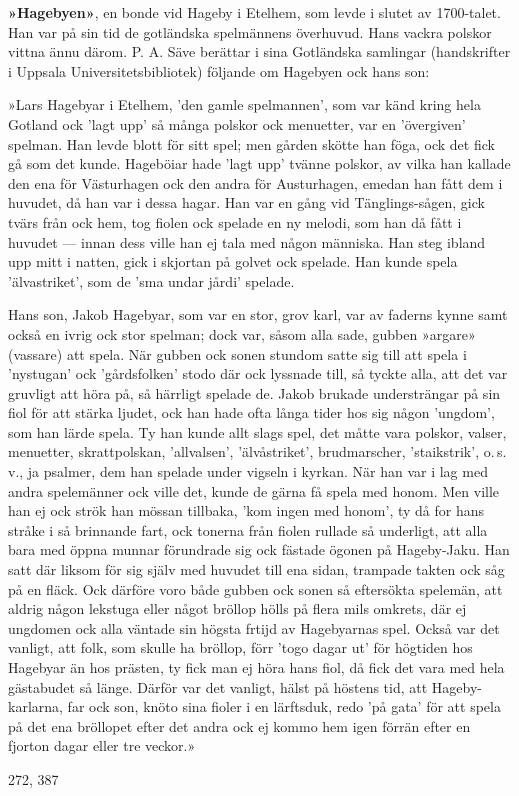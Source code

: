 \textbf{»Hagebyen»}, en bonde vid Hageby i Etelhem, som levde i slutet av 1700-talet. Han var på sin tid de gotländska spelmännens överhuvud. Hans vackra polskor vittna ännu därom. P. A. Säve berättar i sina Gotländska samlingar (handskrifter i Uppsala Universitetsbibliotek) följande om Hagebyen ock hans son: 

»Lars Hagebyar i Etelhem, 'den gamle spelmannen', som var känd kring hela Gotland ock 'lagt upp' så många polskor ock menuetter, var en 'övergiven' spelman. Han levde blott för sitt spel; men gården skötte han föga, ock det fick gå som det kunde. Hageböiar hade 'lagt upp' tvänne polskor, av vilka han kallade den ena för Västurhagen ock den andra för Austurhagen, emedan han fått dem i huvudet, då han var i dessa hagar. Han var en gång vid Tänglings-sågen, gick tvärs från ock hem, tog fiolen ock spelade en ny melodi, som han då fått i huvudet --- innan dess ville han ej tala med någon människa. Han steg ibland upp mitt i natten, gick i skjortan på golvet ock spelade. Han kunde spela 'älvastriket', som de 'sma undar jårdi' spelade. 

Hans son, Jakob Hagebyar, som var en stor, grov karl, var av faderns kynne samt också en ivrig ock stor spelman; dock var, såsom alla sade, gubben »argare» (vassare) att spela. När gubben ock sonen stundom satte sig till att spela i 'nystugan' ock 'gårdsfolken' stodo där ock lyssnade till, så tyckte alla, att det var gruvligt att höra på, så härrligt spelade de. Jakob brukade understrängar på sin fiol för att stärka ljudet, ock han hade ofta långa tider hos sig någon 'ungdom', som han lärde spela. Ty han kunde allt slags spel, det måtte vara polskor, valser, menuetter, skrattpolskan, 'allvalsen', 'älvåstriket', brudmarscher, 'staikstrik', o.\,s.\,v., ja psalmer, dem han spelade under vigseln i kyrkan. När han var i lag med andra spelemänner ock ville det, kunde de gärna få spela med honom. Men ville han ej ock strök han mössan tillbaka, 'kom ingen med honom', ty då for hans stråke i så brinnande fart, ock tonerna från fiolen rullade så underligt, att alla bara med öppna munnar förundrade sig ock fästade ögonen på Hageby-Jaku. Han satt där liksom för sig själv med huvudet till ena sidan, trampade takten ock såg på en fläck. Ock därföre voro både gubben ock sonen så eftersökta spelemän, att aldrig någon lekstuga eller något bröllop hölls på flera mils omkrets, där ej ungdomen ock alla väntade sin högsta frtijd av Hagebyarnas spel. Också var det vanligt, att folk, som skulle ha bröllop, förr 'togo dagar ut' för högtiden hos Hagebyar än hos prästen, ty fick man ej höra hans fiol, då fick det vara med hela gästabudet så länge. Därför var det vanligt, hälst på höstens tid, att Hageby-karlarna, far ock son, knöto sina fioler i en lärftsduk, redo 'på gata' för att spela på det ena bröllopet efter det andra ock ej kommo hem igen förrän efter en fjorton dagar eller tre veckor.»

272, 387 
